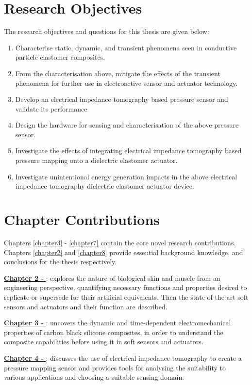 \section{Research Objectives}
The research objectives and questions for this thesis are given below:
\begin{enumerate}
	\item Characterise static, dynamic, and transient phenomena seen in conductive particle elastomer composites.
	\item From the characterisation above, mitigate the effects of the transient phenomena for further use in electroactive sensor and actuator technology.
	\item Develop an electrical impedance tomography based pressure sensor and validate its performance
	\item Design the hardware for sensing and characterisation of the above pressure sensor.
	\item Investigate the effects of integrating electrical impedance tomography based pressure mapping onto a dielectric elastomer actuator.
	\item Investigate unintentional energy generation impacts in the above electrical impedance tomography dielectric elastomer actuator device.
\end{enumerate}



\section{Chapter Contributions}
Chapters \ref{chapter3} - \ref{chapter7} contain the core novel research contributions. Chapters \ref{chapter2} and \ref{chapter8} provide essential background knowledge, and conclusions for the thesis respectively.

\hyperref[chapter2]{\textbf{Chapter 2 - \chapiiname}}: explores the nature of biological skin and muscle from an engineering perspective, quantifying necessary functions and properties desired to replicate or supersede for their artificial equivalents. Then the state-of-the-art soft sensors and actuators and their function are described.

\hyperref[chapter3]{\textbf{Chapter 3 - \chapiiiname}}: uncovers the dynamic and time-dependent electromechanical properties of carbon black silicone composites, in order to understand the composite capabilities before  using it in soft sensors and actuators.

\hyperref[chapter4]{\textbf{Chapter 4 - \chapivname}}: discusses the use of electrical impedance tomography to create a pressure mapping sensor and provides tools for analysing the suitability to various applications and choosing a suitable sensing domain.

